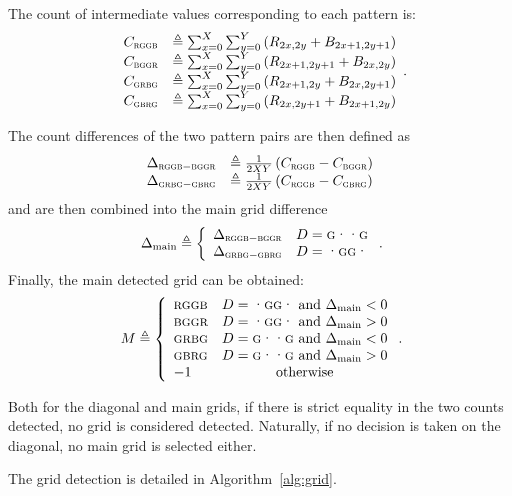 \documentclass{ipol}
\begin{document}
The count of intermediate values corresponding to each pattern is:
\[\phantom.\begin{array}{ll}
        C_{\textsc{rggb}} &\triangleq \sum_{x=0}^X\sum_{y=0}^Y\left(R_{2x, 2y} + B_{2x+1, 2y+1}\right)\\
        C_{\textsc{bggr}} &\triangleq \sum_{x=0}^X\sum_{y=0}^Y\left(R_{2x+1, 2y+1} + B_{2x, 2y}\right)\\
        C_{\textsc{grbg}} &\triangleq \sum_{x=0}^X\sum_{y=0}^Y\left(R_{2x+1, 2y} + B_{2x, 2y+1}\right)\\
        C_{\textsc{gbrg}} &\triangleq \sum_{x=0}^X\sum_{y=0}^Y\left(R_{2x, 2y+1} + B_{2x+1, 2y}\right)
\end{array}.\]

The count differences of the two pattern pairs are then defined as
\[\begin{array}{ll}
        \Delta_{\textsc{rggb}-\textsc{bggr}} &\triangleq \frac 1 {2XY}\left( C_{\textsc{rggb}} - C_{\textsc{bggr}}\right)\\
\Delta_{\textsc{grbg}-\textsc{gbrg}} &\triangleq \frac 1 {2XY}\left(C_{\textsc{rggb}} - C_{\textsc{gbrg}}\right)\end{array}\]
and are then combined into the main grid difference
\[\phantom.\Delta_{\mathrm{main}}\triangleq\left\{\begin{array}{lc}
        \Delta_{\textsc{rggb}-\textsc{bggr}}&D=\textsc{g··g}\\
\Delta_{\textsc{grbg}-\textsc{gbrg}}&D=\textsc{·gg·}\end{array}\right..\]
Finally, the main detected grid can be obtained:
\[\phantom.M \triangleq \left\{\begin{array}{lc}
        \textsc{rggb}&D=\textsc{·gg·}\text{ and }\Delta_{\mathrm{main}}<0\\
        \textsc{bggr}&D=\textsc{·gg·}\text{ and }\Delta_{\mathrm{main}}>0\\
        \textsc{grbg}&D=\textsc{g··g}\text{ and }\Delta_{\mathrm{main}}<0\\
        \textsc{gbrg}&D=\textsc{g··g}\text{ and }\Delta_{\mathrm{main}}>0\\
-1&\text{otherwise}\end{array}\right..\]

Both for the diagonal and main grids, if there is strict equality in the two counts detected, no grid is considered detected. Naturally, if no decision is taken on the diagonal, no main grid is selected either.

The grid detection is detailed in Algorithm~\ref{alg:grid}.
\end{document}

